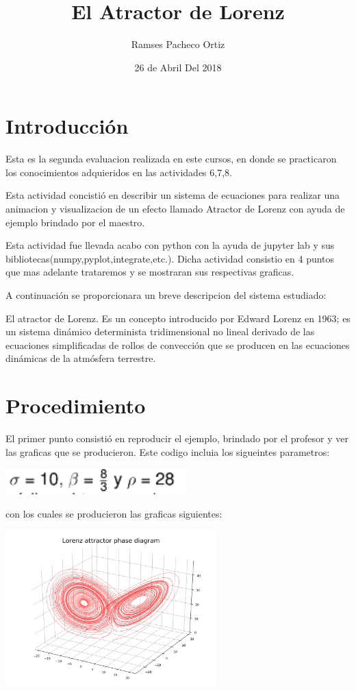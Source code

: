 \documentclass{article}
\begin{document}
\title{El Atractor de Lorenz }
\author{Ramses Pacheco Ortiz}
\date{26 de Abril Del 2018}
\maketitle  


\section{Introducción}

Esta es la segunda evaluacion realizada en este cursos, en donde se practicaron los conocimientos adquieridos en las actividades 6,7,8.


Esta actividad concistió en describir un sistema de ecuaciones para realizar una animacion y visualizacion de un efecto llamado Atractor de Lorenz con ayuda de ejemplo brindado por el maestro.


Esta actividad fue llevada acabo con python con la ayuda de jupyter lab y sus bibliotecas(numpy,pyplot,integrate,etc.).
Dicha actividad consistio en 4 puntos que mas adelante trataremos y se mostraran sus respectivas graficas.


A continuación se proporcionara un breve descripcion del sistema estudiado:

El atractor de Lorenz. Es un concepto introducido por Edward Lorenz en 1963; es un sistema dinámico determinista tridimensional no lineal derivado de las ecuaciones simplificadas de rollos de convección que se producen en las ecuaciones dinámicas de la atmósfera terrestre. 


\section{Procedimiento}

El primer punto consistió en reproducir el ejemplo, brindado por el profesor y ver las graficas que se producieron.
Este codigo incluia los sigueintes parametros:

\begin{center}
\includegraphics[height=1cm]{cod1.png}
\end{center}


con los cuales se producieron las graficas siguientes:

\begin{center}
\includegraphics[height=6cm]{lorenz-attractor-3d-1.png}
\end{center}
\end{document}

